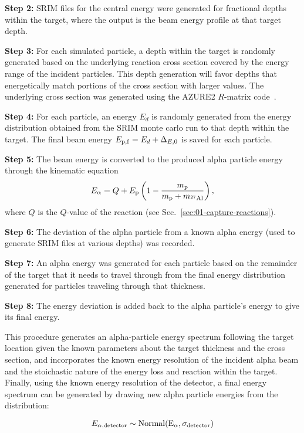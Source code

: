 \textbf{Step 2:}
  SRIM files for the central energy were generated for fractional depths
  within the target, where the output is the beam energy profile at that
  target depth.

\textbf{Step 3:}
  For each simulated particle, a depth within the target is randomly generated
  based on the underlying reaction cross section covered by the energy range of
  the incident particles. This depth generation will favor depths that
  energetically match portions of the cross section with larger values. The
  underlying cross section was generated using the AZURE2 $R$-matrix
  code~\cite{AZURE2, deBoer2017}.

\textbf{Step 4:}
  For each particle, an energy $E_d$ is randomly generated from the energy
  distribution obtained from the SRIM monte carlo run to that depth within the
  target. The final beam energy $E_{\rm{p},f} = E_d + \Delta_{E,0}$ is saved
  for each particle.

\textbf{Step 5:}
  The beam energy is converted to the produced alpha particle energy
  through the kinematic equation
  \[
      E_{\alpha} = Q + E_{\rm p}\left(
          1 - \frac{m_{\rm p}}{m_{\rm p} + m_{{}^{27}\rm{Al}}} %
      \right),
  \]
  where $Q$ is the $Q$-value of the reaction (see
  Sec.~\ref{sec:01-capture-reactions}).

\textbf{Step 6:}
  The deviation of the alpha particle from a known alpha energy (used to
  generate SRIM files at various depths) was recorded.

\textbf{Step 7:}
  An alpha energy was generated for each particle based on the remainder
  of the target that it needs to travel through from the final energy
  distribution generated for particles traveling through that thickness.

\textbf{Step 8:}
  The energy deviation is added back to the alpha particle's energy to
  give its final energy.

This procedure generates an alpha-particle energy spectrum following the
target location given the known parameters about the target thickness
and the cross section, and incorporates the known energy resolution of
the incident alpha beam and the stoichastic nature of the energy loss
and reaction within the target. Finally, using the known energy
resolution of the detector, a final energy spectrum can be generated by
drawing new alpha particle energies from the distribution:

\begin{equation}
    E_{\alpha,\rm{detector}} \sim \rm{Normal}(E_{\alpha},\sigma_{\rm detector})
\end{equation}

